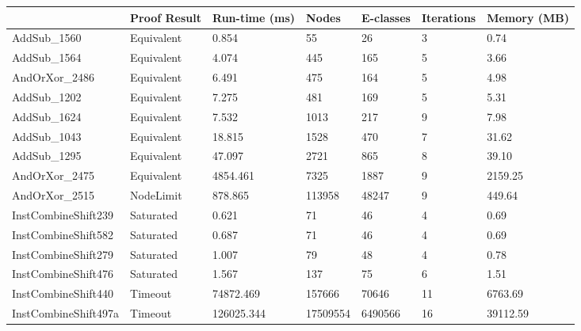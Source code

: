 \begin{tabular}{lllllll}
\toprule
 & Proof Result & Run-time (ms) & Nodes & E-classes & Iterations & Memory (MB) \\
\midrule
AddSub\_1560 & Equivalent & 0.854 & 55 & 26 & 3 & 0.74 \\
AddSub\_1564 & Equivalent & 4.074 & 445 & 165 & 5 & 3.66 \\
AndOrXor\_2486 & Equivalent & 6.491 & 475 & 164 & 5 & 4.98 \\
AddSub\_1202 & Equivalent & 7.275 & 481 & 169 & 5 & 5.31 \\
AddSub\_1624 & Equivalent & 7.532 & 1013 & 217 & 9 & 7.98 \\
AddSub\_1043 & Equivalent & 18.815 & 1528 & 470 & 7 & 31.62 \\
AddSub\_1295 & Equivalent & 47.097 & 2721 & 865 & 8 & 39.10 \\
AndOrXor\_2475 & Equivalent & 4854.461 & 7325 & 1887 & 9 & 2159.25 \\
AndOrXor\_2515 & NodeLimit & 878.865 & 113958 & 48247 & 9 & 449.64 \\
InstCombineShift239 & Saturated & 0.621 & 71 & 46 & 4 & 0.69 \\
InstCombineShift582 & Saturated & 0.687 & 71 & 46 & 4 & 0.69 \\
InstCombineShift279 & Saturated & 1.007 & 79 & 48 & 4 & 0.78 \\
InstCombineShift476 & Saturated & 1.567 & 137 & 75 & 6 & 1.51 \\
InstCombineShift440 & Timeout & 74872.469 & 157666 & 70646 & 11 & 6763.69 \\
InstCombineShift497a & Timeout & 126025.344 & 17509554 & 6490566 & 16 & 39112.59 \\
\bottomrule
\end{tabular}
